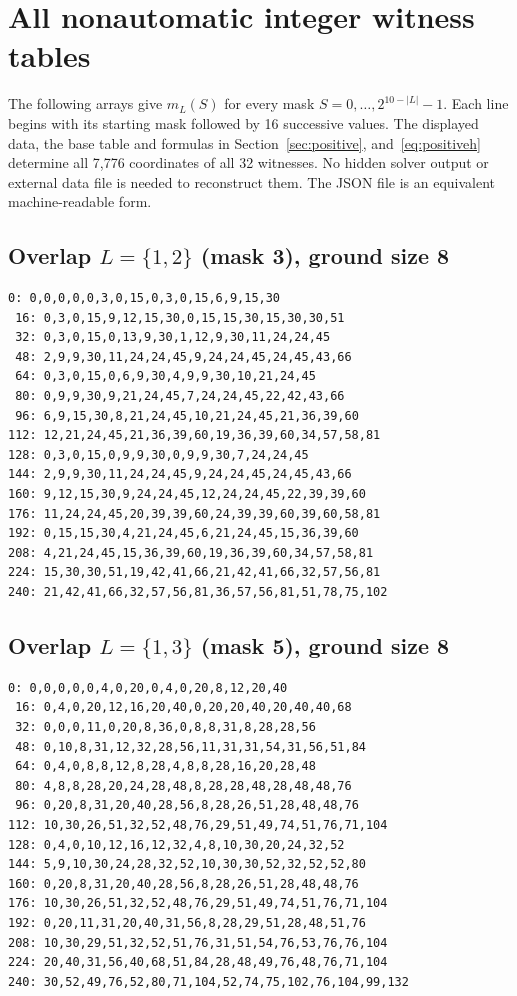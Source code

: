 \documentclass[11pt]{article}
\begin{document}
\section{All nonautomatic integer witness tables}\label{app:positive}
The following arrays give $m_L(S)$ for every mask $S=0,\ldots,2^{10-|L|}-1$.
Each line begins with its starting mask followed by 16 successive values.
The displayed data, the base table and formulas in Section~\ref{sec:positive},
and~\eqref{eq:positiveh} determine all 7,776 coordinates of all 32 witnesses.
No hidden solver output or external data file is needed to reconstruct them.
The JSON file is an equivalent machine-readable form.
\subsection*{Overlap $L=\{1,2\}$ (mask 3), ground size 8}
\begin{Verbatim}[fontsize=\footnotesize]
  0: 0,0,0,0,0,3,0,15,0,3,0,15,6,9,15,30
 16: 0,3,0,15,9,12,15,30,0,15,15,30,15,30,30,51
 32: 0,3,0,15,0,13,9,30,1,12,9,30,11,24,24,45
 48: 2,9,9,30,11,24,24,45,9,24,24,45,24,45,43,66
 64: 0,3,0,15,0,6,9,30,4,9,9,30,10,21,24,45
 80: 0,9,9,30,9,21,24,45,7,24,24,45,22,42,43,66
 96: 6,9,15,30,8,21,24,45,10,21,24,45,21,36,39,60
112: 12,21,24,45,21,36,39,60,19,36,39,60,34,57,58,81
128: 0,3,0,15,0,9,9,30,0,9,9,30,7,24,24,45
144: 2,9,9,30,11,24,24,45,9,24,24,45,24,45,43,66
160: 9,12,15,30,9,24,24,45,12,24,24,45,22,39,39,60
176: 11,24,24,45,20,39,39,60,24,39,39,60,39,60,58,81
192: 0,15,15,30,4,21,24,45,6,21,24,45,15,36,39,60
208: 4,21,24,45,15,36,39,60,19,36,39,60,34,57,58,81
224: 15,30,30,51,19,42,41,66,21,42,41,66,32,57,56,81
240: 21,42,41,66,32,57,56,81,36,57,56,81,51,78,75,102
\end{Verbatim}
\subsection*{Overlap $L=\{1,3\}$ (mask 5), ground size 8}
\begin{Verbatim}[fontsize=\footnotesize]
  0: 0,0,0,0,0,4,0,20,0,4,0,20,8,12,20,40
 16: 0,4,0,20,12,16,20,40,0,20,20,40,20,40,40,68
 32: 0,0,0,11,0,20,8,36,0,8,8,31,8,28,28,56
 48: 0,10,8,31,12,32,28,56,11,31,31,54,31,56,51,84
 64: 0,4,0,8,8,12,8,28,4,8,8,28,16,20,28,48
 80: 4,8,8,28,20,24,28,48,8,28,28,48,28,48,48,76
 96: 0,20,8,31,20,40,28,56,8,28,26,51,28,48,48,76
112: 10,30,26,51,32,52,48,76,29,51,49,74,51,76,71,104
128: 0,4,0,10,12,16,12,32,4,8,10,30,20,24,32,52
144: 5,9,10,30,24,28,32,52,10,30,30,52,32,52,52,80
160: 0,20,8,31,20,40,28,56,8,28,26,51,28,48,48,76
176: 10,30,26,51,32,52,48,76,29,51,49,74,51,76,71,104
192: 0,20,11,31,20,40,31,56,8,28,29,51,28,48,51,76
208: 10,30,29,51,32,52,51,76,31,51,54,76,53,76,76,104
224: 20,40,31,56,40,68,51,84,28,48,49,76,48,76,71,104
240: 30,52,49,76,52,80,71,104,52,74,75,102,76,104,99,132
\end{Verbatim}
\end{document}
